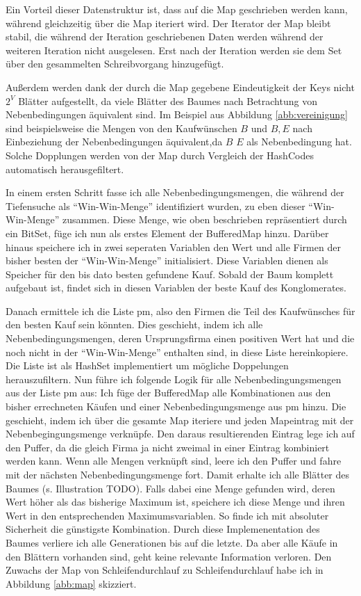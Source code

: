Ein Vorteil dieser Datenstruktur ist, dass auf die Map geschrieben werden kann, während gleichzeitig über die Map iteriert wird. Der Iterator der Map bleibt stabil, die während der Iteration geschriebenen Daten werden während der weiteren Iteration nicht ausgelesen. Erst nach der Iteration werden sie dem Set über den gesammelten Schreibvorgang hinzugefügt.

Außerdem werden dank der durch die Map gegebene Eindeutigkeit der Keys nicht \(2^V\) Blätter aufgestellt, da viele Blätter des Baumes nach Betrachtung von Nebenbedingungen äquivalent sind. Im Beispiel aus Abbildung \ref{abb:vereinigung} sind beispielsweise die Mengen von den Kaufwünschen \(B\) und \(B, E\) nach Einbeziehung der Nebenbedingungen äquivalent,da \(B\) \(E\) als Nebenbedingung hat. Solche Dopplungen werden von der Map durch Vergleich der HashCodes automatisch herausgefiltert.

In einem ersten Schritt fasse ich alle Nebenbedingungsmengen, die während der Tiefensuche als "`Win-Win-Menge"' identifiziert wurden, zu eben dieser "`Win-Win-Menge"' zusammen. Diese Menge, wie oben beschrieben repräsentiert durch ein BitSet, füge ich nun als erstes Element der BufferedMap hinzu.
Darüber hinaus speichere ich in zwei seperaten Variablen den Wert und alle Firmen der bisher besten der "`Win-Win-Menge"' initialisiert. Diese Variablen dienen als Speicher für den bis dato besten gefundene Kauf. Sobald der Baum komplett aufgebaut ist, findet sich in diesen Variablen der beste Kauf des Konglomerates.

Danach ermittele ich die Liste pm, also den Firmen die Teil des Kaufwünsches für den besten Kauf sein könnten. Dies geschieht, indem ich alle Nebenbedingungsmengen, deren Ursprungsfirma einen positiven Wert hat und die noch nicht in der "`Win-Win-Menge"' enthalten sind, in diese Liste hereinkopiere. Die Liste ist als HashSet implementiert um mögliche Doppelungen herauszufiltern. Nun führe ich folgende Logik für alle Nebenbedingungsmengen aus der Liste pm aus:
Ich füge der BufferedMap alle Kombinationen aus den bisher errechneten Käufen und einer Nebenbedingungsmenge aus pm hinzu. Die geschieht, indem ich über die gesamte Map iteriere und jeden Mapeintrag mit der Nebenbegingungsmenge verknüpfe. Den daraus resultierenden Eintrag lege ich auf den Puffer, da die gleich Firma ja nicht zweimal in einer Eintrag kombiniert werden kann. Wenn alle Mengen verknüpft sind, leere ich den Puffer und fahre mit der nächsten Nebenbedingungsmenge fort. Damit erhalte ich alle Blätter des Baumes (s. Illustration TODO). Falls dabei eine Menge gefunden wird, deren Wert höher als das bisherige Maximum ist, speichere ich diese Menge und ihren Wert in den entsprechenden Maximumsvariablen. So finde ich mit absoluter Sicherheit die günstigste Kombination. Durch diese Implemenentation des Baumes verliere ich alle Generationen bis auf die letzte. Da aber alle Käufe in den Blättern vorhanden sind, geht keine relevante Information verloren. Den Zuwachs der Map von Schleifendurchlauf zu Schleifendurchlauf habe ich in Abbildung \ref{abb:map} skizziert.

